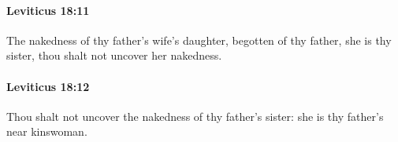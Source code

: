 		\paragraph{Leviticus 18:11} %
			\label{LEVITICUS-18-11}

			The nakedness of thy father’s wife’s daughter, begotten of thy father, she is thy sister, thou shalt not uncover her nakedness.


		\paragraph{Leviticus 18:12} %
			\label{LEVITICUS-18-12}

			Thou shalt not uncover the nakedness of thy father’s sister: she is thy father’s near kinswoman.


